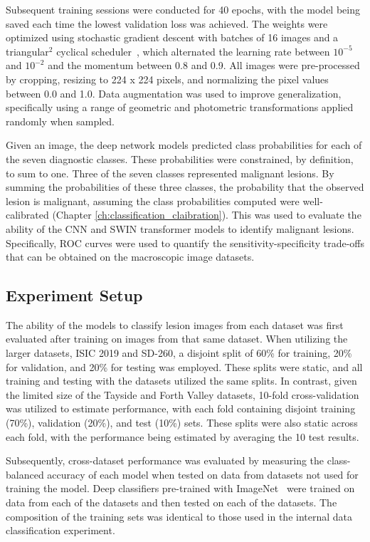 Subsequent training sessions were conducted for 40 epochs, with the model being saved each time the lowest validation loss was achieved. The weights were optimized using stochastic gradient descent with batches of 16 images and a triangular$^2$ cyclical scheduler~\citep{smith2017cyclical}, which alternated the learning rate between $10^{-5}$ and $10^{-2}$ and the momentum between 0.8 and 0.9. All images were pre-processed by cropping, resizing to 224 x 224 pixels, and normalizing the pixel values between 0.0 and 1.0. Data augmentation was used to improve generalization, specifically using a range of geometric and photometric transformations applied randomly when sampled.

Given an image, the deep network models predicted class probabilities for each of the seven diagnostic classes. These probabilities were constrained, by definition, to sum to one. Three of the seven classes represented malignant lesions. By summing the probabilities of these three classes, the probability that the observed lesion is malignant, assuming the class probabilities computed were well-calibrated (Chapter \ref{ch:classification_claibration}). This was used to evaluate the ability of the CNN and SWIN transformer models to identify malignant lesions. Specifically, ROC curves were used to quantify the sensitivity-specificity trade-offs that can be obtained on the macroscopic image datasets. 

\subsection{Experiment Setup}
\label{subsec:generalisation_experiment}
The ability of the models to classify lesion images from each dataset was first evaluated after training on images from that same dataset. When utilizing the larger datasets, ISIC 2019 and SD-260, a disjoint split of 60\% for training, 20\% for validation, and 20\% for testing was employed. These splits were static, and all training and testing with the datasets utilized the same splits. In contrast, given the limited size of the Tayside and Forth Valley datasets, 10-fold cross-validation was utilized to estimate performance, with each fold containing disjoint training (70\%), validation (20\%), and test (10\%) sets. These splits were also static across each fold, with the performance being estimated by averaging the 10 test results.

Subsequently, cross-dataset performance was evaluated by measuring the class-balanced accuracy of each model when tested on data from datasets not used for training the model. Deep classifiers pre-trained with ImageNet~\citep{deng2009imagenet} were trained on data from each of the datasets and then tested on each of the datasets. The composition of the training sets was identical to those used in the internal data classification experiment.

